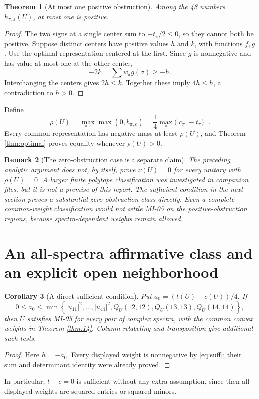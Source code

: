 \documentclass[11pt,a4paper]{article}
\newtheorem{theorem}{Theorem}[section]
\newtheorem{corollary}[theorem]{Corollary}
\newtheorem{remark}[theorem]{Remark}
\newcommand{\eps}{\varepsilon}
\begin{document}
\begin{theorem}[At most one positive obstruction]\label{thm:unique}
Among the 48 numbers $h_{\pi,\eps}(U)$, at most one is positive.
\end{theorem}
\begin{proof}
The two signs at a single center sum to $-t_\pi/2\le0$, so they cannot both be positive. Suppose distinct centers have positive values $h$ and $k$, with functions $f,g$. Use the optimal representation centered at the first. Since $g$ is nonnegative and has value at most one at the other center,
\[
-2k=\sum w_\sigma g(\sigma)\ge-h.
\]
Interchanging the centers gives $2h\le k$. Together these imply $4h\le h$, a contradiction to $h>0$.
\end{proof}

Define
\begin{equation}\label{eq:rho}
\rho(U)=\max_{\pi,\eps}\max(0,h_{\pi,\eps})
=\frac14\max_\pi\bigl(|c_\pi|-t_\pi\bigr)_+.
\end{equation}
Every common representation has negative mass at least $\rho(U)$, and Theorem \ref{thm:optimal} proves equality whenever $\rho(U)>0$.

\begin{remark}[The zero-obstruction case is a separate claim]\label{rem:zero}
The preceding analytic argument does not, by itself, prove $\nu(U)=0$ for every unitary with $\rho(U)=0$. A larger finite polytope classification was investigated in companion files, but it is not a premise of this report. The sufficient condition in the next section proves a substantial zero-obstruction class directly. Even a complete common-weight classification would not settle MI-05 on the positive-obstruction regions, because spectra-dependent weights remain allowed.
\end{remark}

\section{An all-spectra affirmative class and an explicit open neighborhood}
\begin{corollary}[A direct sufficient condition]\label{cor:suff}
Put $a_0=(t(U)+c(U))/4$. If
\begin{equation}\label{eq:suff}
0\le a_0\le\min\left\{|u_{11}|^2,\ldots,|u_{44}|^2,
Q_U(12,12),Q_U(13,13),Q_U(14,14)\right\},
\end{equation}
then $U$ satisfies MI-05 for every pair of complex spectra, with the common convex weights in Theorem \ref{thm:14}. Column relabeling and transposition give additional such tests.
\end{corollary}
\begin{proof}
Here $h=-a_0$. Every displayed weight is nonnegative by \eqref{eq:suff}; their sum and determinant identity were already proved.
\end{proof}
In particular, $t+c=0$ is sufficient without any extra assumption, since then all displayed weights are squared entries or squared minors.
\end{document}
